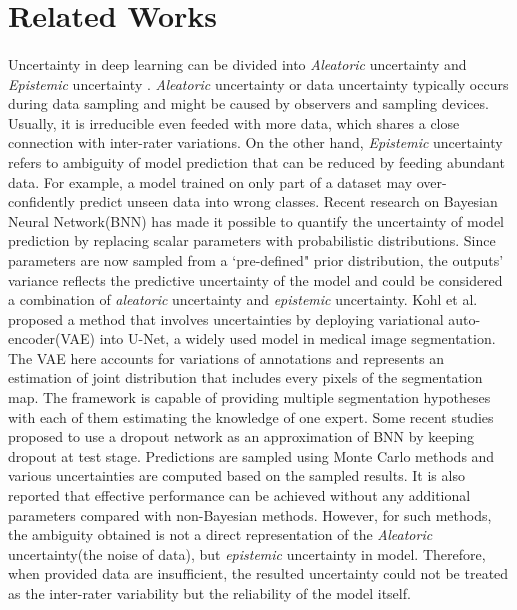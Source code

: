 \documentclass[12pt]{extarticle}
\begin{document}
\section{Related Works}
\paragraph{}
Uncertainty in deep learning can be divided into \textit{Aleatoric}
uncertainty and \textit{Epistemic} uncertainty \cite{kendall2017uncertainties}.
\textit{Aleatoric} uncertainty or data uncertainty typically occurs during data sampling and might be caused by 
observers and sampling devices.
Usually, it is irreducible even feeded with more data, which shares a
close connection with inter-rater variations. On the other hand, \textit{Epistemic}
uncertainty refers to ambiguity of model prediction that can be reduced by feeding abundant data.
For example, a model trained on only part of a dataset may over-confidently
predict unseen data into wrong classes. Recent research on 
Bayesian Neural Network(BNN) has made it possible to quantify the 
uncertainty of model prediction by replacing scalar parameters with probabilistic distributions. Since parameters are now sampled 
from a `pre-defined" prior distribution, 
the outputs' variance reflects the predictive uncertainty of the model and could be considered a 
combination of \textit{aleatoric} uncertainty and \textit{epistemic} uncertainty. 
Kohl et al.\cite{kohl2019probabilistic} 
proposed a method that involves uncertainties by deploying variational auto-encoder(VAE) into U-Net, a widely used model in medical image segmentation\cite{ronneberger2015unet}. 
The VAE here accounts for variations of annotations and represents an 
estimation of joint distribution that includes every pixels of the segmentation map. 
The framework is capable of providing multiple segmentation 
hypotheses with each of them estimating the knowledge of one expert.
Some recent studies proposed to use a dropout network as an approximation of BNN by keeping dropout at test stage. 
Predictions are sampled using Monte Carlo methods and various 
uncertainties are computed based on the sampled results.
It is also reported that effective performance can be achieved 
without any additional parameters compared with non-Bayesian methods. 
However, for such methods, the ambiguity obtained is
not a direct representation of the \textit{Aleatoric} uncertainty(the noise of data), but \textit{epistemic} uncertainty in model\cite{kendall2017uncertainties}. 
Therefore, when provided data are insufficient, the resulted uncertainty could not be treated as the inter-rater variability but the reliability of the model itself\cite{nair_precup_arnold_arbel_2020}. 
\end{document}
